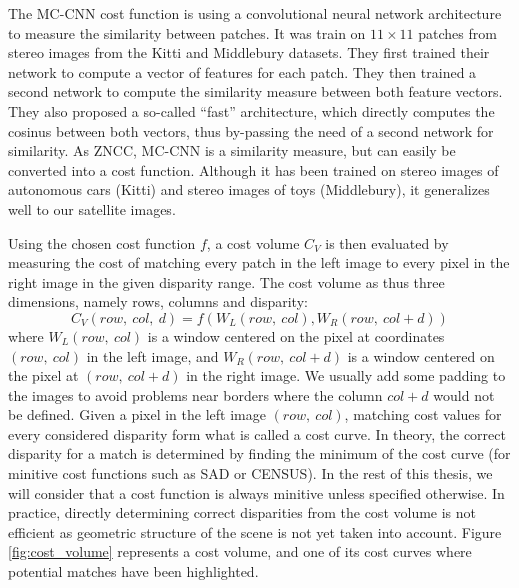 \begin{example}
	The MC-CNN cost function \cite{zbontar_stereo_2016} is using a convolutional neural network architecture to measure the similarity between patches. It was train on $11\times 11$ patches from stereo images from the Kitti \cite{geiger_vision_2013, menze_object_2015} and Middlebury \cite{scharstein_taxonomy_2001,scharstein_high-accuracy_2003,hirschmuller_evaluation_2007,scharstein_learning_2007,scharstein_high-resolution_2014} datasets. They first trained their network to compute a vector of features for each patch. They then trained a second network to compute the similarity measure between both feature vectors. They also proposed a so-called ``fast'' architecture, which directly computes the cosinus between both vectors, thus by-passing the need of a second network for similarity. As ZNCC, MC-CNN is a similarity measure, but can easily be converted into a cost function. Although it has been trained on stereo images of autonomous cars (Kitti) and stereo images of toys (Middlebury), it generalizes well to our satellite images.
\end{example}
	
Using the chosen cost function $f$, a cost volume $C_V$ is then evaluated by measuring the cost of matching every patch in the left image to every pixel in the right image in the given disparity range. The cost volume as thus three dimensions, namely rows, columns and disparity:
\begin{equation}\label{eq:cost_volume}
    C_V(row, ~col, ~d) = f(W_L(row, ~col),  W_R(row, ~col+d))
\end{equation}
where $W_L(row, ~col)$ is a window centered on the pixel at coordinates $(row, ~col)$ in the left image, and $W_R(row, ~col+d)$ is a window centered on the pixel at $(row, ~col+d)$ in the right image. We usually add some padding to the images to avoid problems near borders where the column $col+d$ would not be defined. Given a pixel in the left image $(row, ~col)$, matching cost values for every considered disparity form what is called a cost curve. In theory, the correct disparity for a match is determined by finding the minimum of the cost curve (for minitive cost functions such as SAD or CENSUS). In the rest of this thesis, we will consider that a cost function is always minitive unless specified otherwise. In practice, directly determining correct disparities from the cost volume is not efficient as geometric structure of the scene is not yet taken into account. Figure \ref{fig:cost_volume} represents a cost volume, and one of its cost curves where potential matches have been highlighted. 

